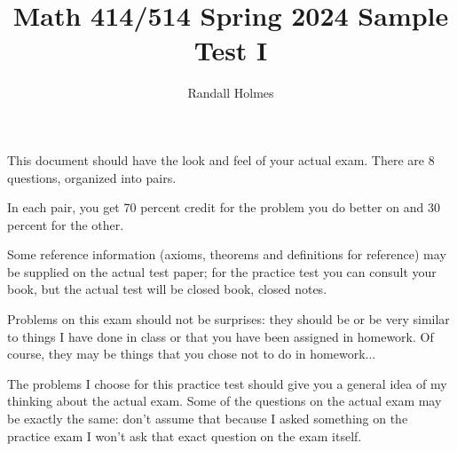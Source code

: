 \documentclass[12pt]{article}
\title{Math 414/514 Spring 2024 Sample Test I}
\author{Randall Holmes}
\begin{document}
\maketitle

This document should have the look and feel of your actual exam.  There are 8 questions, organized into pairs.

In each pair, you get 70 percent credit for the problem you do better on and 30 percent for the other.

Some reference information (axioms, theorems and definitions for reference) may be supplied on the actual test paper; for the practice test you can consult your book, but the actual test will be closed book, closed notes.

Problems on this exam should not be surprises:  they should be or be very similar to things I have done in class or that you have been assigned in homework.  Of course, they may be things
that you chose not to do in homework...

The problems I choose for this practice test should give you a general idea of my thinking about the actual exam.   Some of the questions on the actual exam may be exactly the same:  don't assume that because I asked something on the practice exam I won't ask that exact question on the exam itself.

\newpage
\end{document}
